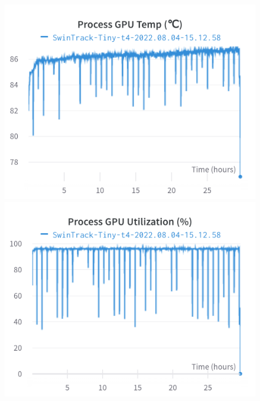 \documentclass{article}
\begin{document}
\begin{figure}[h]
\includegraphics[width=\linewidth]{charts/Section-4-Panel-4-5dnby78hs}
\caption{}
\endminipage\hfill
{}
\includegraphics[width=\linewidth]{charts/Section-4-Panel-5-j98vft24r}
\caption{}
\endminipage
\end{figure}
\end{document}
